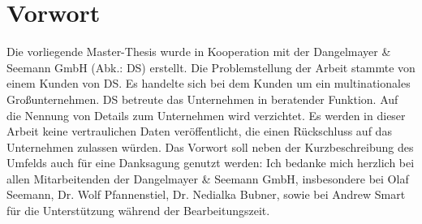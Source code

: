 \chapter*{Vorwort}
Die vorliegende Master-Thesis wurde in Kooperation mit der Dangelmayer \& Seemann GmbH (Abk.: DS) erstellt. Die Problemstellung der Arbeit stammte von einem Kunden von DS. Es handelte sich bei dem Kunden um ein multinationales Großunternehmen. DS betreute das Unternehmen in beratender Funktion. Auf die Nennung von Details zum Unternehmen wird verzichtet. Es werden in dieser Arbeit keine vertraulichen Daten veröffentlicht, die einen Rückschluss auf das Unternehmen zulassen würden. Das Vorwort soll neben der Kurzbeschreibung des Umfelds auch für eine Danksagung genutzt werden: Ich bedanke mich herzlich bei allen Mitarbeitenden der Dangelmayer \& Seemann GmbH, insbesondere bei Olaf Seemann, Dr. Wolf Pfannenstiel, Dr. Nedialka Bubner, sowie bei Andrew Smart für die Unterstützung während der Bearbeitungszeit. 
